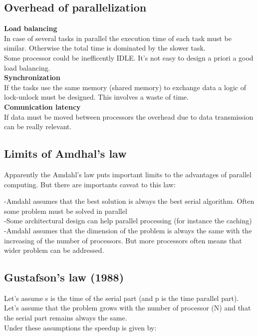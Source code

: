 \subsection{Overhead of parallelization}

\textbf{Load balancing}\\
In case of several tasks in parallel the execution time of each task must be similar. Otherwise the total time is dominated by the slower task.\\
Some processor could be inefficently IDLE. It’s not easy to design a priori a good load balancing.\\

\textbf{Synchronization}\\
If the tasks use the same memory (shared memory) to exchange data a logic of lock-unlock must be designed. This involves a waste of time.\\

\textbf{Comunication latency}\\
If data must be moved between processors the overhead due to data transmission can be really relevant.

\subsection{Limits of Amdhal’s law}
Apparently the Amdahl’s law puts important limits to the advantages of parallel computing. But there are importants caveat to this law:

-Amdahl assumes that the best solution is always the best serial
algorithm. Often some problem must be solved in parallel\\
-Some architectural design can help parallel processing (for instance
the caching)\\
-Amdahl assumes that the dimension of the problem is always the
same with the increasing of the number of processors. But more
processors often means that wider problem can be addressed.

\subsection{Gustafson’s law (1988)}
Let’s assume s is the time of the serial part (and p is the time parallel part).\\
Let’s assume that the problem grows with the number of processor (N) and that the serial part remains always the same.\\
Under these assumptions the speedup is given by:

